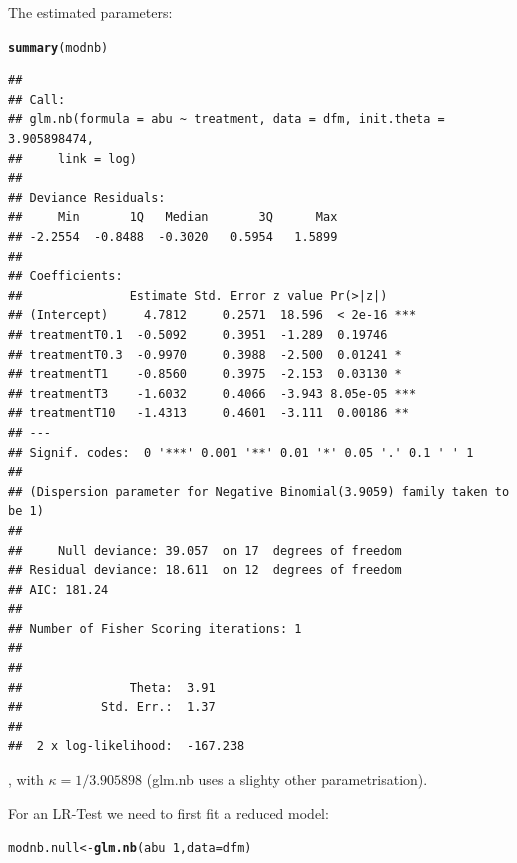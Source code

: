 \documentclass{scrartcl}\usepackage[]{graphicx}\usepackage[]{color}
\makeatletter
\newcommand{\hlnum}[1]{\textcolor[rgb]{0.686,0.059,0.569}{#1}}%
\newcommand{\hlopt}[1]{\textcolor[rgb]{0,0,0}{#1}}%
\newcommand{\hlstd}[1]{\textcolor[rgb]{0.345,0.345,0.345}{#1}}%
\newcommand{\hlkwb}[1]{\textcolor[rgb]{0.69,0.353,0.396}{#1}}%
\newcommand{\hlkwc}[1]{\textcolor[rgb]{0.333,0.667,0.333}{#1}}%
\newcommand{\hlkwd}[1]{\textcolor[rgb]{0.737,0.353,0.396}{\textbf{#1}}}%
\newenvironment{kframe}{%
 \def\at@end@of@kframe{}%
 \ifinner\ifhmode%
  \def\at@end@of@kframe{\end{minipage}}%
  \begin{minipage}{\columnwidth}%
 \fi\fi%
 \def\FrameCommand##1{\hskip\@totalleftmargin \hskip-\fboxsep
 \colorbox{shadecolor}{##1}\hskip-\fboxsep
     \hskip-\linewidth \hskip-\@totalleftmargin \hskip\columnwidth}%
 \MakeFramed {\advance\hsize-\width
   \@totalleftmargin\z@ \linewidth\hsize
   \@setminipage}}%
 {\par\unskip\endMakeFramed%
 \at@end@of@kframe}
\newenvironment{knitrout}{}{} %
\makeatother
\begin{document}
The estimated parameters:
\begin{knitrout}
\color{fgcolor}\begin{kframe}
\begin{alltt}
\hlkwd{summary}\hlstd{(modnb)}
\end{alltt}
\begin{verbatim}
## 
## Call:
## glm.nb(formula = abu ~ treatment, data = dfm, init.theta = 3.905898474, 
##     link = log)
## 
## Deviance Residuals: 
##     Min       1Q   Median       3Q      Max  
## -2.2554  -0.8488  -0.3020   0.5954   1.5899  
## 
## Coefficients:
##               Estimate Std. Error z value Pr(>|z|)    
## (Intercept)     4.7812     0.2571  18.596  < 2e-16 ***
## treatmentT0.1  -0.5092     0.3951  -1.289  0.19746    
## treatmentT0.3  -0.9970     0.3988  -2.500  0.01241 *  
## treatmentT1    -0.8560     0.3975  -2.153  0.03130 *  
## treatmentT3    -1.6032     0.4066  -3.943 8.05e-05 ***
## treatmentT10   -1.4313     0.4601  -3.111  0.00186 ** 
## ---
## Signif. codes:  0 '***' 0.001 '**' 0.01 '*' 0.05 '.' 0.1 ' ' 1
## 
## (Dispersion parameter for Negative Binomial(3.9059) family taken to be 1)
## 
##     Null deviance: 39.057  on 17  degrees of freedom
## Residual deviance: 18.611  on 12  degrees of freedom
## AIC: 181.24
## 
## Number of Fisher Scoring iterations: 1
## 
## 
##               Theta:  3.91 
##           Std. Err.:  1.37 
## 
##  2 x log-likelihood:  -167.238
\end{verbatim}
\end{kframe}
\end{knitrout}
, with $\kappa = 1 / 3.905898$ (glm.nb uses a slighty other parametrisation).

For an LR-Test we need to first fit a reduced model:
\begin{knitrout}
\color{fgcolor}\begin{kframe}
\begin{alltt}
\hlstd{modnb.null} \hlkwb{<-} \hlkwd{glm.nb}\hlstd{(abu} \hlopt{~} \hlnum{1}\hlstd{,} \hlkwc{data} \hlstd{= dfm)}
\end{alltt}
\end{kframe}
\end{knitrout}
\end{document}
